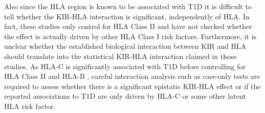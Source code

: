 Also since the HLA region is known to be associated with T1D it is difficult to tell whether the KIR-HLA interaction is significant, independently
of HLA.
In fact, these studies only control for HLA Class II and have not checked whether the effect is actually driven by other HLA Class I risk factors.
Furthermore, it is unclear whether the established biological interaction between KIR and HLA should translate into the statistical KIR-HLA interaction claimed in those studies.
As HLA-C is significantly associated with T1D before controlling for HLA Class II and HLA-B \citep{Nejentsev:2007dv,Howson:2009bl}, careful interaction analysis such as case-only tests \citep{Yang:1999wk,Cordell:2009jb} are required to assess whether there is a significant epistatic KIR-HLA effect or if the reported associations to T1D are only driven by HLA-C or some other latent HLA risk factor.




